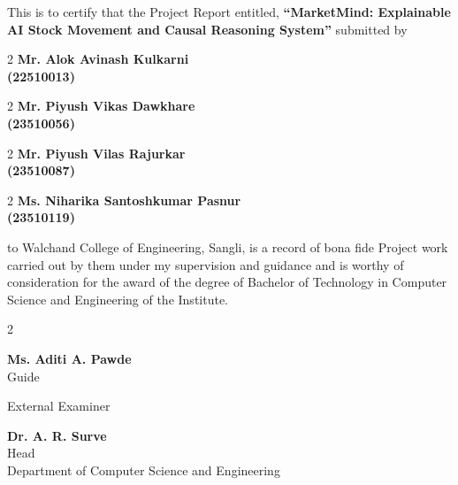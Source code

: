 \documentclass{article}
\begin{document}
	\par
	\setlength{\parindent}{4em}
	\space
	This is to certify that the Project Report entitled, 
	\textbf{``MarketMind: Explainable AI Stock Movement and Causal Reasoning System''} submitted by\\		
	\begin{multicols}{2}	
	\textbf{Mr. Alok Avinash Kulkarni\\ (22510013)}
	\end{multicols}
	\begin{multicols}{2}
	\textbf{Mr. Piyush Vikas Dawkhare\\ (23510056)}
	\end{multicols} 
	\begin{multicols}{2}
	\textbf{Mr. Piyush Vilas Rajurkar\\ (23510087)}
	\end{multicols} 
	\begin{multicols}{2}
	\textbf{Ms. Niharika Santoshkumar Pasnur\\ (23510119)}
	\end{multicols} 
	to Walchand College of Engineering, Sangli, is a record of bona fide Project work carried out by them under my supervision and guidance and is worthy of consideration for the award of the degree of Bachelor of Technology in Computer Science and Engineering of the Institute. 

	\vspace{1.8cm}
	\begin{multicols}{2}
		\begin{center}
		\textbf{Ms. Aditi A. Pawde}
		\\ Guide
		\end{center}
		\columnbreak
		\begin{center}
		External Examiner
		\end{center}
	\end{multicols}

	\vspace{1.2cm}
	\begin{center}
		\textbf{Dr. A. R. Surve}
		\\ Head
		\\ Department of Computer Science and Engineering
	\end{center}

	\pagebreak
	
\end{document}
